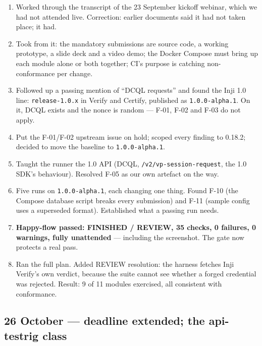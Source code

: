 \documentclass[10pt,a4paper]{article}
\newcommand{\tightlist}{\setlength{\itemsep}{1pt}\setlength{\parskip}{0pt}\setlength{\parsep}{0pt}}
\begin{document}
\begin{enumerate}\tightlist
  \item Worked through the transcript of the 23 September kickoff webinar, which we had not
        attended live. Correction: earlier documents said it had not taken place; it had.
  \item Took from it: the mandatory submissions are source code, a working prototype, a
        slide deck and a video demo; the Docker Compose must bring up each module alone or
        both together; CI's purpose is catching non-conformance per change.
  \item Followed up a passing mention of ``DCQL requests'' and found the Inji 1.0 line:
        \texttt{release-1.0.x} in Verify and Certify, published as \texttt{1.0.0-alpha.1}.
        On it, DCQL exists and the nonce is random --- F-01, F-02 and F-03 do not apply.
  \item Put the F-01/F-02 upstream issue on hold; scoped every finding to 0.18.2; decided to
        move the baseline to \texttt{1.0.0-alpha.1}.
  \item Taught the runner the 1.0 API (DCQL, \texttt{/v2/vp-session-request}, the 1.0 SDK's
        behaviour). Resolved F-05 as our own artefact on the way.
  \item Five runs on \texttt{1.0.0-alpha.1}, each changing one thing. Found F-10 (the Compose
        database script breaks every submission) and F-11 (sample config uses a superseded
        format). Established what a passing run needs.
  \item \textbf{Happy-flow passed: FINISHED / REVIEW, 35 checks, 0 failures, 0 warnings, fully
        unattended} --- including the screenshot. The gate now protects a real pass.
  \item Ran the full plan. Added REVIEW resolution: the harness fetches Inji Verify's own
        verdict, because the suite cannot see whether a forged credential was rejected.
        Result: 9 of 11 modules exercised, all consistent with conformance.
\end{enumerate}

\subsection{26 October --- deadline extended; the api-testrig class}
\end{document}
